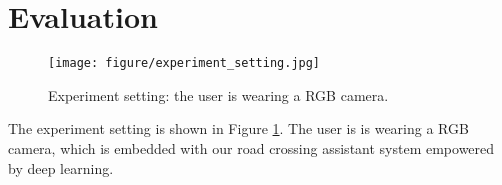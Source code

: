 \section{Evaluation}
\begin{figure}[t]
	\begin{center}
		\texttt{[image: figure/experiment\_setting.jpg]}
	\end{center}
	\caption{Experiment setting: the user is wearing a RGB camera.}
	\label{fig:expset}
\end{figure}

The experiment setting is shown in Figure \ref*{fig:expset}. The user is is wearing a RGB camera, which is embedded with our road crossing assistant system empowered by deep learning.

\para{}